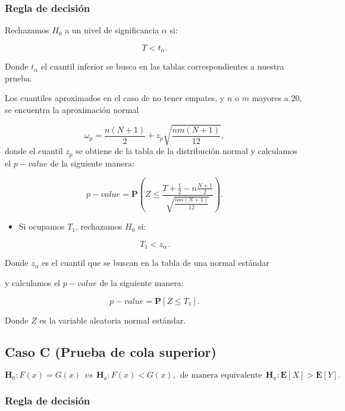 \documentclass[
  a4paper,
  oneside,
  openany]{book}
\providecommand{\tightlist}{%
  \setlength{\itemsep}{0pt}\setlength{\parskip}{0pt}}
\begin{document}
\hypertarget{regla-de-decisiuxf3n-14}{%
\subsubsection*{Regla de decisión}\label{regla-de-decisiuxf3n-14}}


Rechazamos \(H_0\) a un nivel de significancia \(\alpha\) si:

\[T < t_{\alpha}.\]

Donde \(t_{\alpha}\) el cuantil inferior se busca en las tablas correspondientes a nuestra prueba.

Los cuantiles aproximados en el caso de no tener empates, y \(n\) o \(m\) mayores a 20, se encuentra la aproximación normal

\[\omega_p= \frac{n(N+1)}{2} + z_p\sqrt{\frac{n m(N+1)}{12}},\]
donde el cuantil \(z_p\) se obtiene de la tabla de la distribución normal y calculamos el \(p-value\) de la siguiente manera:

\[p-value = \mathbf{P}\left(Z\leq\frac{T+\frac{1}{2}-n\frac{N+1}{2}}{\sqrt{\frac{nm(N+1)}{12}}}\right).\]

\begin{itemize}
\tightlist
\item
  Si ocupamos \(T_{1}\), rechazamos \(H_0\) si:
\end{itemize}

\[T_{1} < z_{\alpha}.\]

Donde \(z_{\alpha}\) es el cuantil que se buscan en la tabla de una normal estándar

y calculamos el \(p-value\) de la siguiente manera:

\[p-value=\mathbf{P}[Z\leq T_{1}].\]

Donde \(Z\) es la variable aleatoria normal estándar.

\hypertarget{caso-c-prueba-de-cola-superior-4}{%
\subsection*{Caso C (Prueba de cola superior)}\label{caso-c-prueba-de-cola-superior-4}}


\[\textbf{H}_0: F(x) = G(x) \ \ vs \ \ \textbf{H}_a: F(x) < G(x), \  \ \mbox{de manera equivalente} \ \ \textbf{H}_a:\mathbf{E}[X]  > \mathbf{E}[Y].\]

\hypertarget{regla-de-decisiuxf3n-15}{%
\subsubsection*{Regla de decisión}\label{regla-de-decisiuxf3n-15}}
\end{document}
